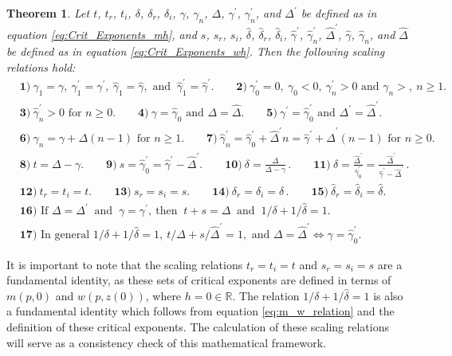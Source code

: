\documentclass[english,12pt,jmp,graphicx]{revtex4-1}
\newtheorem{theorem}{Theorem}[section]
\newcommand{\gh}{\hat{\gamma}}
\newcommand{\Dh}{\hat{\Delta}}
\newcommand{\dha}{\hat{\delta}}
\begin{document}
\begin{theorem} \label{thm:Crit_Theory_m_w}
  Let $t$, $t_r$, $t_i$, $\delta$, $\delta_r$, $\delta_i$, $\gamma$, $\gamma_n$, $\Delta$, $\gamma^\prime$, $\gamma_n^\prime$,
  and $\Delta^\prime$ be defined as in equation \eqref{eq:Crit_Exponents_mh},
  and $s$, $s_r$, $s_i$, $\dha$, $\dha_r$, $\dha_i$, $\gh^\prime$, $\gh_n^\prime$,
  $\Dh^\prime$, $\gh$, $\gh_n$, and $\Dh$ be defined as in equation
  \eqref{eq:Crit_Exponents_wh}. Then the following scaling relations
  hold:
%  
  \begin{align*}   
   &\mathbf{1)} \ \gamma_1=\gamma, \ \gamma_1^\prime=\gamma^\prime, \ \gh_1=\gh, \text{ and } \ \gh_1^\prime=\gh^\prime. \qquad
     \mathbf{2)} \ \gamma_0^\prime=0, \ \gamma_0<0, \ \gamma_n^\prime>0 \text{ and } \gamma_n>, \ n\geq1.\\
   &\mathbf{3)} \ \gh_n^\prime>0 \text{ for } n\geq0. \qquad
   \mathbf{4)} \ \gamma=\gh_0 \text{ and } \Delta=\Dh. \qquad
   \mathbf{5)} \ \gamma^\prime=\gh_0^\prime \text{ and } \Delta^\prime=\Dh^\prime. \\
   &\mathbf{6)} \ \gamma_n=\gamma+\Delta(n-1) \text{ for } n\geq1. \qquad
   \mathbf{7)} \ \gh_n^\prime=\gh_0^\prime+\Dh^\prime n=\gh^\prime+\Dh^\prime(n-1) \text{ for } n\geq0. \\
   &\mathbf{8)} \ t=\Delta-\gamma. \qquad 
   \mathbf{9)} \ s=\gh_0^\prime=\gh^\prime-\Dh^\prime. \qquad
   \mathbf{10)} \ \delta=\frac{\Delta}{\Delta-\gamma}\,. \qquad
   \mathbf{11)} \ \dha=\frac{\Dh^\prime}{\gh_0^\prime}=\frac{\Dh^\prime}{\gh^\prime-\Dh^\prime}\,. \\
   &\mathbf{12)} \ t_r=t_i=t. \qquad
   \mathbf{13)} \ s_r=s_i=s. \qquad
   \mathbf{14)}  \ \delta_r=\delta_i=\delta\,. \qquad
   \mathbf{15)} \ \dha_r=\dha_i=\dha. \\
   &\mathbf{16)} \text{ If } \Delta=\Delta^\prime \ \text{ and } \ \gamma=\gamma^\prime, \ \text{
     then } \ t+s=\Delta \ \text{ and } \ 1/\delta+1/\dha=1.\\
   &\mathbf{17)} \text{ In general } 1/\delta+1/\dha=1, \ t/\Delta+s/\Dh^\prime=1,
   \text{ and }  \Delta=\Dh^\prime\iff\gamma=\gh_0^\prime. 
  \end{align*}
%  
\end{theorem}
%
It is important to note that the scaling relations $t_r=t_i=t$ and
$s_r=s_i=s$ are a fundamental identity, as these sets of critical
exponents are defined in terms of $m(p,0)$ and $w(p,z(0))$, where
$h=0\in\mathbb{R}$. The relation $1/\delta+1/\dha=1$ is also a fundamental
identity which follows from equation \eqref{eq:m_w_relation} and the
definition of these critical exponents. The calculation of these
scaling relations will serve as a consistency check of this
mathematical framework.  
\end{document}
